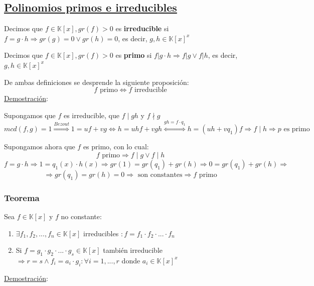 \documentclass[10pt,a4paper,openright]{book}
\begin{document}
\subsection*{\underline{Polinomios primos e irreducibles}}
Decimos que $f\in \mathbb K[x], gr(f)>0$ es \textbf{irreducible} si $f=g\cdot h \Rightarrow gr(g)=0 \vee gr(h)=0$, es decir, $g,h\in \mathbb K[x]^x$\par
Decimos que $f\in \mathbb K[x], gr(f)>0$ es \textbf{primo} si $f|g\cdot h \Rightarrow f|g \vee f|h$, es decir, $g,h\in \mathbb K[x]^x$\par
De ambas definiciones se desprende la siguiente proposición:
$$f\mbox{ primo}\Leftrightarrow f \mbox{ irreducible}$$
\underline{Demostración}:\par
Supongamos que $f$ es irreducible, que $f\mid gh$ y $f\nmid g$
$$mcd(f,g)=1\stackrel{Bezout}{\Rightarrow} 1=uf+vg\Leftrightarrow h=uhf+vgh \stackrel{gh=f\cdot q_1}\Leftrightarrow h=(uh+vq_1)f\Rightarrow f\mid h \Rightarrow p \mbox{ es primo}$$

Supongamos ahora que $f$ es primo, con lo cual:
$$f\mbox{ primo} \Rightarrow f\mid g \vee f\mid h$$
$$f=g\cdot h \Rightarrow 1=q_1(x)\cdot h(x) \Rightarrow gr(1)=gr(q_1)+gr(h)\Rightarrow 0=gr(q_1)+gr(h)\Rightarrow $$
$$\Rightarrow gr(q_1)=gr(h)=0 \Rightarrow \mbox{ son constantes} \Rightarrow f \mbox{ primo}$$

\subsubsection*{Teorema}
Sea $f\in \mathbb K[x]$ y $f$ no constante:
\begin{enumerate}
\item $\exists f_1,f_2, ..., f_n\in \mathbb K[x]$ irreducibles $: f=f_1\cdot f_2 \cdot ... \cdot f_n$

\item Si $f=g_1\cdot g_2 \cdot ... \cdot g_s \in \mathbb K[x]$ también irreducible $\Rightarrow r=s \wedge f_i=a_i\cdot g_i : \forall i=1,...,r$ donde $a_i\in \mathbb K[x]^x$
\end{enumerate}

\underline{Demostración}:
\end{document}
